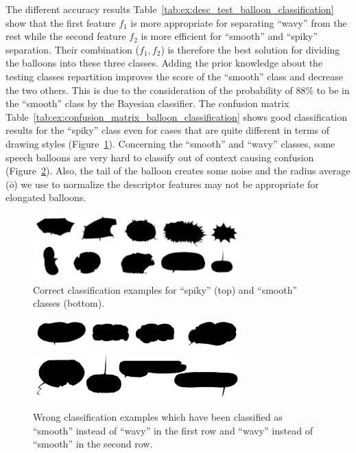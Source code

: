 The different accuracy results Table~\ref{tab:ex:desc_test_balloon_classification} show that the first feature $f_1$ is more appropriate for separating ``wavy'' from the rest while the second feature $f_2$ is more efficient for ``smooth'' and ``spiky'' separation.
Their combination ($f_1, f_2$) is therefore the best solution for dividing the balloons into these three classes.
Adding the prior knowledge about the testing classes repartition improves the score of the ``smooth'' class and decrease the two others.
This is due to the consideration of the probability of 88\% to be in the ``smooth'' class by the Bayesian classifier.
The confusion matrix Table~\ref{tab:ex:confusion_matrix_balloon_classification} shows good classification results for the ``spiky'' class even for cases that are quite different in terms of drawing styles (Figure~\ref{fig:good_detection_balloon_classification}).
Concerning the ``smooth'' and ``wavy'' classes, some speech balloons are very hard to classify out of context causing confusion (Figure~\ref{fig:bad_detection_balloon_classification}).
Also, the tail of the balloon creates some noise and the radius average ($\bar{o}$) we use to normalize the descriptor features may not be appropriate for elongated balloons.


  \begin{figure}[h]  %
    \centering
    \includegraphics[trim = 0mm 0mm 0mm 0mm, clip, width=300px]{good_detection.png}
    \caption{Correct classification examples for ``spiky'' (top) and ``smooth'' classes (bottom).}
    \label{fig:good_detection_balloon_classification}
  \end{figure}


  \begin{figure}[h]  %
    \centering
    \includegraphics[trim = 0mm 0mm 0mm 0mm, clip, width=300px]{bad_detection.png}
    \includegraphics[trim = 0mm 0mm 0mm 0mm, clip, width=300px]{wavy_instead_smooth.png}
    \caption{Wrong classification examples which have been classified as ``smooth'' instead of  ``wavy'' in the first row and ``wavy'' instead of  ``smooth'' in the second row.}
    \label{fig:bad_detection_balloon_classification}
  \end{figure}


